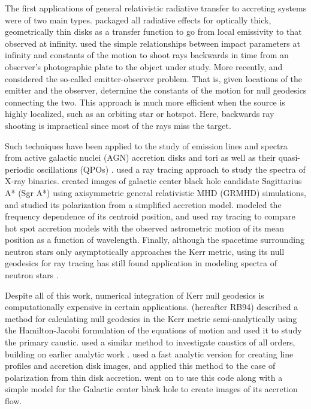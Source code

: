 \documentclass[apj]{emulateapj}
\begin{document}
The first applications of general relativistic radiative transfer to accreting systems were of two main types. \citet{cunningham1975} packaged all radiative effects for optically thick, geometrically thin disks as a transfer function to go from local emissivity to that observed at infinity. \citet{luminet1979} used the simple relationships between impact parameters at infinity and constants of the motion to shoot rays backwards in time from an observer's photographic plate to the object under study. More recently, \citet{viergutz1993} and \citet{beckwithdone2005} considered the so-called emitter-observer problem. That is, given locations of the emitter and the observer, determine the constants of the motion for null geodesics connecting the two. This approach is much more efficient when the source is highly localized, such as an orbiting star or hotspot. Here, backwards ray shooting is impractical since most of the rays miss the target.

Such techniques have been applied to the study of emission lines and spectra from active galactic nuclei (AGN) accretion disks and tori \citep{cadez1998,wu2007} as well as their quasi-periodic oscillations (QPOs) \citep{schnittman2006}. \citet{li2005} used a ray tracing approach to study the spectra of X-ray binaries. \citet{noble2007} created images of galactic center black hole candidate Sagittarius A* (Sgr A*) using axisymmetric general relativistic MHD (GRMHD) simulations, and \citet{bromley2001} studied its polarization from a simplified accretion model. \citet{broderickloeb2006} modeled the frequency dependence of its centroid position, and \citet{reid2008} used ray tracing to compare hot spot accretion models with the observed astrometric motion of its mean position as a function of wavelength. Finally, although the spacetime surrounding neutron stars only asymptotically approaches the Kerr metric, using its null geodesics for ray tracing has still found application in modeling spectra of neutron stars \citep{braje2000}.

Despite all of this work, numerical integration of Kerr null geodesics is computationally expensive in certain applications. \citet{rauchblandford}  (hereafter RB94) described a method for calculating null geodesics in the Kerr metric semi-analytically using the Hamilton-Jacobi formulation of the equations of motion and used it to study the primary caustic. \citet{bozza2008} used a similar method to investigate caustics of all orders, building on earlier analytic work \citep{bozza2002}. \citet{fanton1997} used a fast analytic version for creating line profiles and accretion disk images, and \citet{agolphd} applied this method to the case of polarization from thin disk accretion. \citet{falcke} went on to use this code along with a simple model for the Galactic center black hole to create images of its accretion flow.
\end{document}
